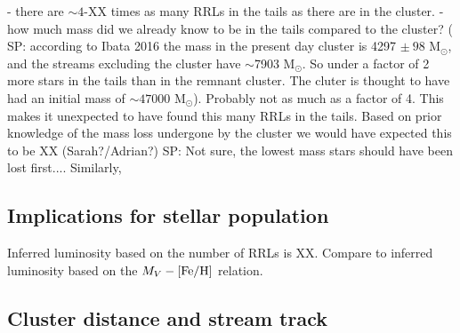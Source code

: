 \documentclass[twocolumn]{aastex63}
\newcommand{\sa}[1]{{\color{teal} SP: #1}}
\begin{document}


- there are $\sim4$-XX times as many RRLs in the tails as there are in the cluster.
- how much mass did we already know to be in the tails compared to the cluster? (\sa{according to Ibata 2016 the mass in the present day cluster is 4297 $\pm~ 98$ M$_{\odot}$, and the streams excluding the cluster have $\sim$7903 M$_{\odot}$. So under a factor of 2 more stars in the tails than in the remnant cluster}. The cluter is thought to have had an initial mass of $\sim47000$ M$_{\odot}$). Probably not as much as a factor of 4. This makes it unexpected to have found this many RRLs in the tails. Based on prior knowledge of the mass loss undergone by the cluster we would have expected this to be XX (Sarah?/Adrian?) \sa{Not sure, the lowest mass stars should have been lost first...}. Similarly,




\subsection{Implications for stellar population}


 Inferred luminosity based on the number of RRLs is XX. Compare to inferred luminosity based on the $M_V-[\mathrm{Fe}/\mathrm{H}]$ relation.

\subsection{Cluster distance and stream track}





\end{document}
